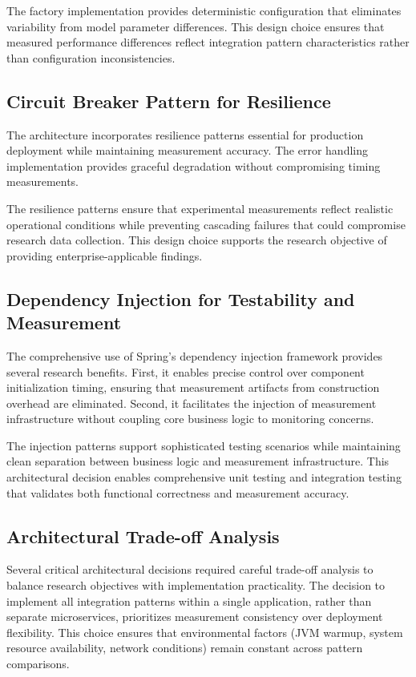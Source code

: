 The factory implementation provides deterministic configuration that eliminates variability from model parameter differences. This design choice ensures that measured performance differences reflect integration pattern characteristics rather than configuration inconsistencies.

\subsection{Circuit Breaker Pattern for Resilience}

The architecture incorporates resilience patterns essential for production deployment while maintaining measurement accuracy. The error handling implementation provides graceful degradation without compromising timing measurements.

The resilience patterns ensure that experimental measurements reflect realistic operational conditions while preventing cascading failures that could compromise research data collection. This design choice supports the research objective of providing enterprise-applicable findings.

\subsection{Dependency Injection for Testability and Measurement}

The comprehensive use of Spring's dependency injection framework provides several research benefits. First, it enables precise control over component initialization timing, ensuring that measurement artifacts from construction overhead are eliminated. Second, it facilitates the injection of measurement infrastructure without coupling core business logic to monitoring concerns.

The injection patterns support sophisticated testing scenarios while maintaining clean separation between business logic and measurement infrastructure. This architectural decision enables comprehensive unit testing and integration testing that validates both functional correctness and measurement accuracy.


\subsection{Architectural Trade-off Analysis}

Several critical architectural decisions required careful trade-off analysis to balance research objectives with implementation practicality. The decision to implement all integration patterns within a single application, rather than separate microservices, prioritizes measurement consistency over deployment flexibility. This choice ensures that environmental factors (JVM warmup, system resource availability, network conditions) remain constant across pattern comparisons.

